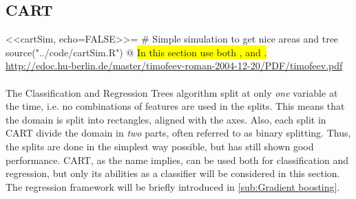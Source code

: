 \subsection{CART}
\label{sub:CART}
<<cartSim, echo=FALSE>>=
# Simple simulation to get nice areas and tree
source("../code/cartSim.R")
@
\colorbox{yellow}{In this section use both \cite{bishop} , \cite{modstat} and \cite{breiman}.}\\
\url{http://edoc.hu-berlin.de/master/timofeev-roman-2004-12-20/PDF/timofeev.pdf}\\\\
%
The Classification and Regression Trees algorithm split at only \textit{one} variable at the time, i.e. no combinations of features are used in the splits. This means that the domain is split into rectangles, aligned with the axes. 
Also, each split in CART divide the domain in \textit{two} parts, often referred to as binary splitting. Thus, the splits are done in the simplest way possible, but has still shown good performance. CART, as the name implies, can be used both for classification and regression, but only its abilities as a classifier will be considered in this section. The regression framework will be briefly introduced in \ref{sub:Gradient boosting}.

